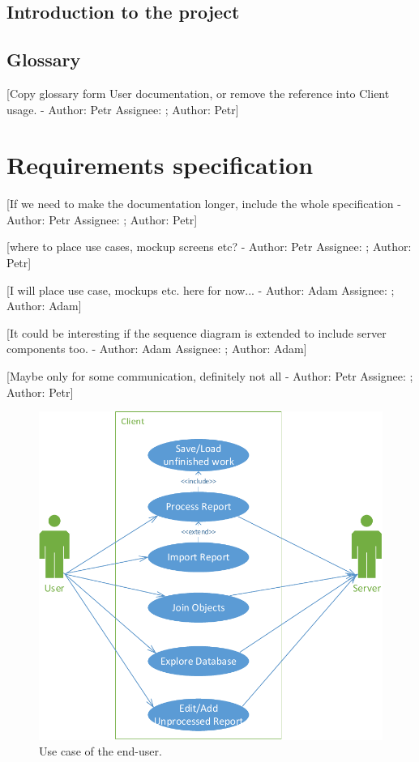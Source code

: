 \documentclass[12pt,a4paper]{report}
\makeatletter
\newcommand{\comment}[3][\@empty]{
  {\color{magenta}[#3 - }
  {\color{green}\ifx\@empty#1\relax Author: #2 \else Assignee: #1; Author: #2\fi}{\color{magenta}]}
}
\makeatother
\begin{document}
\section{Introduction to the project}



\section{Glossary}
\comment{Petr}{Copy glossary form User documentation, or remove the reference into
Client usage.}



\chapter{Requirements specification}
\comment{Petr}{If we need to make the documentation longer, include the whole specification}


\comment{Petr}{where to place use cases, mockup screens etc?}

\comment{Adam}{I will place use case, mockups etc. here for now...}

\comment{Adam}{It could be interesting if the sequence diagram is extended to include server components too.}
\comment{Petr}{Maybe only for some communication, definitely not all}

\begin{figure}[!htb]
        \centering
        \includegraphics[width=\textwidth]{Images/UseCase1}
        \caption{Use case of the end-user.}
        \label{fig:UseCase1}
\end{figure}
\end{document}

